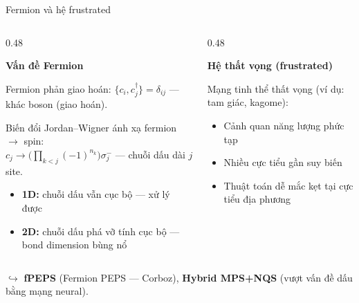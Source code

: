 \documentclass[aspectratio=169, 11pt]{beamer}
\newcommand{\highlight}[1]{\textcolor{qcyan}{\textbf{#1}}}
\newcommand{\warn}[1]{\textcolor{qamber}{#1}}
\begin{document}
\begin{frame}{Fermion và hệ frustrated}

\begin{columns}[T]
\begin{column}{0.48\textwidth}

\textcolor{qpink}{\textbf{Vấn đề Fermion}}\\[4pt]
{\small Fermion phản giao hoán: $\{c_i, c_j^\dagger\} = \delta_{ij}$ — khác boson (giao hoán).

\vspace{2pt}
Biến đổi Jordan--Wigner ánh xạ fermion $\to$ spin:\\
$c_j \to \bigl(\prod_{k<j}(-1)^{n_k}\bigr)\sigma_j^-$ — chuỗi dấu dài $j$ site.

\vspace{4pt}
\begin{itemize}
  \item \textbf{1D:} chuỗi dấu vẫn cục bộ — xử lý được
  \item \textbf{2D:} chuỗi dấu phá vỡ tính cục bộ — bond dimension \warn{bùng nổ}
\end{itemize}}

\end{column}
\begin{column}{0.48\textwidth}

\textcolor{qpink}{\textbf{Hệ thất vọng (frustrated)}}\\[4pt]
{\small Mạng tinh thể thất vọng (ví dụ: tam giác, kagome):

\vspace{4pt}
\begin{itemize}
  \item Cảnh quan năng lượng phức tạp
  \item Nhiều cực tiểu gần suy biến
  \item Thuật toán dễ mắc kẹt tại cực tiểu địa phương
\end{itemize}}

\end{column}
\end{columns}

\vspace{12pt}
{\small\textcolor{dimtext}{$\hookrightarrow$ \highlight{fPEPS} (Fermion PEPS — Corboz), \highlight{Hybrid MPS+NQS} (vượt vấn đề dấu bằng mạng neural).}}

\end{frame}
\end{document}
